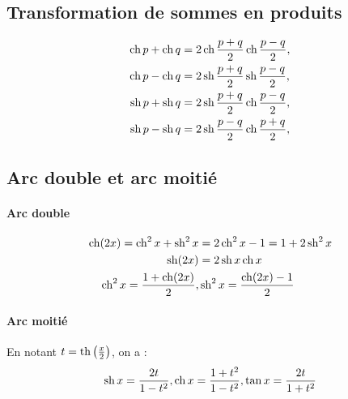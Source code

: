 \subsection{Transformation de sommes en produits}
\begin{align}
  \operatorname{ch} p + \operatorname{ch} q &= 2 \operatorname{ch} \frac{p+q}{2} \operatorname{ch} \frac{p-q}{2}, \\ \operatorname{ch} p - \operatorname{ch} q &= 2 \operatorname{sh} \frac{p+q}{2} \operatorname{sh} \frac{p-q}{2},\\
  \operatorname{sh} p + \operatorname{sh} q &= 2 \operatorname{sh} \frac{p+q}{2} \operatorname{ch} \frac{p-q}{2}, \\ \operatorname{sh} p - \operatorname{sh} q &= 2 \operatorname{sh} \frac{p-q}{2} \operatorname{ch} \frac{p+q}{2},
\end{align}
\subsection{Arc double et arc moitié}
\paragraph{Arc double}
\begin{align}
  \operatorname{ch}(2x)=\operatorname{ch}^2 x + \operatorname{sh}^2 x &= 2\operatorname{ch}^2 x -1 = 1+2\operatorname{sh}^2 x \\
  \operatorname{sh}(2x)&=2\operatorname{sh} x \operatorname{ch} x \\
  \operatorname{ch}^2 x = \frac{1+\operatorname{ch}(2x)}{2}, & \operatorname{sh}^2 x = \frac{\operatorname{ch}(2x)-1}{2}
\end{align}
\paragraph{Arc moitié}
En notant \(t = \operatorname{th} \left(\frac{x}{2}\right)\), on a :
\begin{equation}
  \operatorname{sh} x = \frac{2t}{1-t^2}, \operatorname{ch} x = \frac{1+t^2}{1-t^2}, \tan x = \frac{2t}{1+t^2}
\end{equation}
